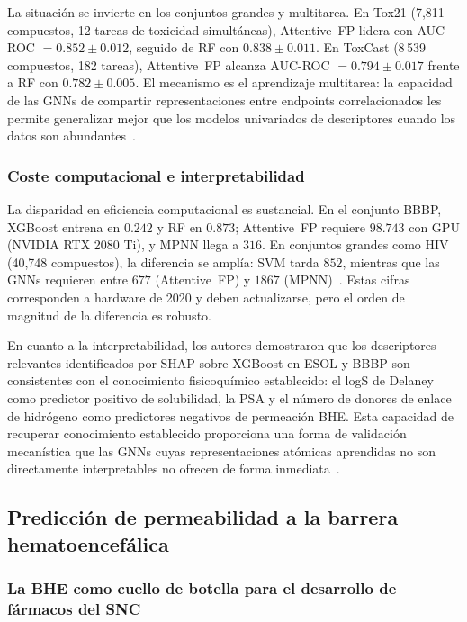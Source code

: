 La situación se invierte en los conjuntos grandes y multitarea. En Tox21 (7,811 compuestos, 12 tareas de toxicidad simultáneas), Attentive~FP lidera con AUC-ROC $= 0.852 \pm 0.012$, seguido de RF con $0.838 \pm 0.011$. En ToxCast (8\,539 compuestos, 182 tareas), Attentive~FP alcanza AUC-ROC $= 0.794 \pm 0.017$ frente a RF con $0.782 \pm 0.005$. El mecanismo es el aprendizaje multitarea: la capacidad de las GNNs de compartir representaciones entre endpoints correlacionados les permite generalizar mejor que los modelos univariados de descriptores cuando los datos son abundantes~\cite{jiang_could_2021}.
 
\subsubsection{Coste computacional e interpretabilidad}
 
La disparidad en eficiencia computacional es sustancial. En el conjunto BBBP, XGBoost entrena en $0.242$ y RF en $0.873$; Attentive~FP requiere $98.743$ con GPU (NVIDIA RTX 2080 Ti), y MPNN llega a $316$. En conjuntos grandes como HIV (40,748 compuestos), la diferencia se amplía: SVM tarda $852$, mientras que las GNNs requieren entre $677$ (Attentive~FP) y $1867$ (MPNN)~\cite{jiang_could_2021}. Estas cifras corresponden a hardware de 2020 y deben actualizarse, pero el orden de magnitud de la diferencia es robusto.
 
En cuanto a la interpretabilidad, los autores demostraron que los descriptores relevantes identificados por SHAP sobre XGBoost en ESOL y BBBP son consistentes con el conocimiento fisicoquímico establecido: el logS de Delaney como predictor positivo de solubilidad, la PSA y el número de donores de enlace de hidrógeno como predictores negativos de permeación BHE. Esta capacidad de recuperar conocimiento establecido proporciona una forma de validación mecanística que las GNNs cuyas representaciones atómicas aprendidas no son directamente interpretables no ofrecen de forma inmediata~\cite{jiang_could_2021}.



\subsection{Predicción de permeabilidad a la barrera hematoencefálica}
\label{ssec:arte_bhe}


\subsubsection{La BHE como cuello de botella para el desarrollo de fármacos del SNC}
 
